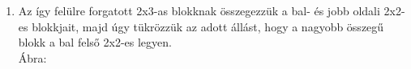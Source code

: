 \documentclass[a4paper, 11pt]{article}
\begin{document}
\begin{enumerate}
    \item Az így felülre forgatott 2x3-as blokknak összegezzük a bal- és jobb oldali 2x2-es blokkjait, majd úgy tükrözzük az adott állást, hogy a nagyobb összegű blokk a bal felső 2x2-es legyen. \\
    Ábra:
    \begin{center}
    \end{center}
\end{enumerate}
\end{document}
